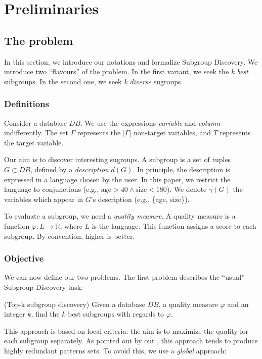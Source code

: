 \section{Preliminaries}
\label{sec:preliminaries}

\subsection{The problem}
In this section, we introduce our notations and formalize Subgroup
Discovery. We introduce two ``flavours'' of the problem. In
the first variant, we seek the \emph{k best} subgroups. In the second one,
we seek \emph{k diverse} sugroups.

\subsubsection{Definitions}
Consider a database $DB$. We use the expressions \emph{variable} and
\emph{column} indifferently. The set $\Gamma$
represents the $|\Gamma|$ non-target variables, and $T$ represents the target
variable.

Our aim is to discover interesting sugroups. A subgroup is a set of tuples $G
\subset DB$, defined by a \emph{description} $d(G)$. In principle, the
description is expressed in a language chosen by the user. In this paper, we
restrict the language to conjunctions (e.g., $\text{age} > 40 \wedge
\text{size} < 180$). We denote $\gamma(G)$ the variables which appear in $G$'s
description (e.g., \{age, size\}).

To evaluate a subgroup, we need a \emph{quality measure}. A quality measure is
a function $\varphi : L \to \mathbb{R}$, where $L$ is the language. This
function assigns a score to each subgroup.  By convention, higher is better.

\subsubsection{Objective}
We can now define our two problems. The first problem describes the ``usual'' Subgroup
Discovery task:

\begin{problem}
    (Top-k subgroup discovery) Given a database $DB$, a quality measure
    $\varphi$ and an integer $k$, find the $k$ best subgroups with regards to
    $\varphi$.
\end{problem}

This approach is based on local criteria: the aim is to maximize the quality
for each subgroup separately. As pointed out by out  \cite{van2011non}, this
approach tends to produce highly redundant patterns sets. To avoid this, we use
a \emph{global} approach: 

